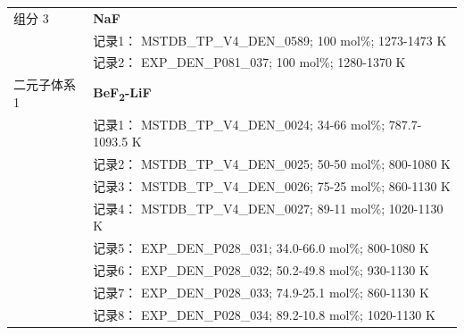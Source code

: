 \documentclass[12pt]{article}
\begin{document}
{\begin{longtable}[]{@{}
  >{\raggedright\arraybackslash}p{}
  >{\raggedright\arraybackslash}p{}@{}}
组分 3  & \textbf{NaF} \\
 & 记录1： MSTDB\_TP\_V4\_DEN\_0589; 100 mol\%; 1273-1473 K \\
 & 记录2： EXP\_DEN\_P081\_037; 100 mol\%; 1280-1370 K  \\

二元子体系 1  & \textbf{BeF\textsubscript{2}-LiF} \\
 & 记录1： MSTDB\_TP\_V4\_DEN\_0024; 34-66 mol\%; 787.7-1093.5 K \\
 & 记录2： MSTDB\_TP\_V4\_DEN\_0025; 50-50 mol\%; 800-1080 K \\
 & 记录3： MSTDB\_TP\_V4\_DEN\_0026; 75-25 mol\%; 860-1130 K \\
 & 记录4： MSTDB\_TP\_V4\_DEN\_0027; 89-11 mol\%; 1020-1130 K \\
 & 记录5： EXP\_DEN\_P028\_031; 34.0-66.0 mol\%; 800-1080 K \\
 & 记录6： EXP\_DEN\_P028\_032; 50.2-49.8 mol\%; 930-1130 K \\
 & 记录7： EXP\_DEN\_P028\_033; 74.9-25.1 mol\%; 860-1130 K \\
 & 记录8： EXP\_DEN\_P028\_034; 89.2-10.8 mol\%; 1020-1130 K  \\


\end{longtable}}
\end{document}
